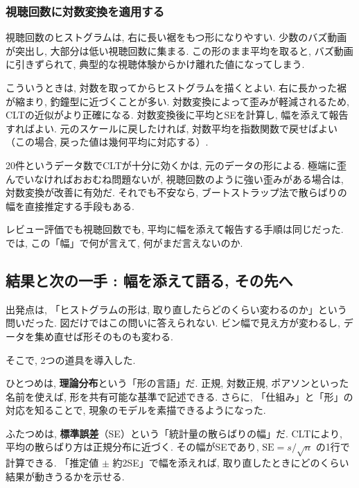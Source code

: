     \subsubsection*{視聴回数に対数変換を適用する}

    視聴回数のヒストグラムは, 右に長い裾をもつ形になりやすい.
    少数のバズ動画が突出し, 大部分は低い視聴回数に集まる.
    この形のまま平均を取ると, バズ動画に引きずられて, 典型的な視聴体験からかけ離れた値になってしまう.


    こういうときは, 対数を取ってからヒストグラムを描くとよい.
    右に長かった裾が縮まり, 釣鐘型に近づくことが多い.
    対数変換によって歪みが軽減されるため, CLTの近似がより正確になる.
    対数変換後に平均とSEを計算し, 幅を添えて報告すればよい.
    元のスケールに戻したければ, 対数平均を指数関数で戻せばよい（この場合, 戻った値は幾何平均に対応する）.

    20件というデータ数でCLTが十分に効くかは, 元のデータの形による.
    極端に歪んでいなければおおむね問題ないが, 視聴回数のように強い歪みがある場合は, 対数変換が改善に有効だ.
    それでも不安なら, ブートストラップ法で散らばりの幅を直接推定する手段もある.

    レビュー評価でも視聴回数でも, 平均に幅を添えて報告する手順は同じだった.
    では, この「幅」で何が言えて, 何がまだ言えないのか.

  \subsection{結果と次の一手 : 幅を添えて語る, その先へ}

    出発点は, 「ヒストグラムの形は, 取り直したらどのくらい変わるのか」という問いだった.
    図だけではこの問いに答えられない.
    ビン幅で見え方が変わるし, データを集め直せば形そのものも変わる.

    そこで, 2つの道具を導入した.

    ひとつめは, \textbf{理論分布}という「形の言語」だ.
    正規, 対数正規, ポアソンといった名前を使えば, 形を共有可能な基準で記述できる.
    さらに, 「仕組み」と「形」の対応を知ることで, 現象のモデルを素描できるようになった.

    ふたつめは, \textbf{標準誤差}（SE）という「統計量の散らばりの幅」だ.
    CLTにより, 平均の散らばり方は正規分布に近づく.
    その幅がSEであり, $\mathrm{SE} = s / \sqrt{n}$ の1行で計算できる.
    「推定値 $\pm$ 約$2$SE」で幅を添えれば, 取り直したときにどのくらい結果が動きうるかを示せる.

